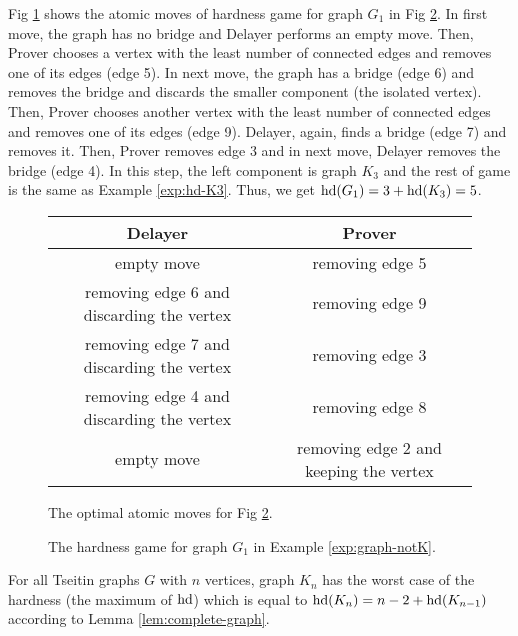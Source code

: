 \documentclass{report}
\begin{document}
\begin{examp}\label{exp:graph-notK}
Fig \ref{fig:game4} shows the atomic moves of hardness game for graph $G_1$ in Fig \ref{fig:hd4}. In first move, the graph has no bridge and Delayer performs an empty move. Then, Prover chooses a vertex with the least number of connected edges and removes one of its edges (edge 5). In next move, the graph has a bridge (edge 6) and removes the bridge and discards the smaller component (the isolated vertex). Then, Prover chooses another vertex with the least number of connected edges and removes one of its edges (edge 9). Delayer, again, finds a bridge (edge 7) and removes it. Then, Prover removes edge 3 and in next move, Delayer removes the bridge (edge 4). In this step, the left component is graph $K_3$ and the rest of game is the same as Example \ref{exp:hd-K3}. Thus, we get $\operatorname{hd}(G_1)=3+\operatorname{hd}(K_3)=5$.
  \begin{figure}[h]
  \centering
  \begin{tabular}{|c|c|} 
  \hline
                  Delayer & Prover \\ \hline
                  empty move & removing edge 5  \\ \hline
		  removing edge 6 and discarding the vertex & removing edge 9  \\ \hline
		  removing edge 7 and discarding the vertex & removing edge 3  \\ \hline
		  removing edge 4 and discarding the vertex & removing edge 8  \\ \hline
		  empty move & removing edge 2  and keeping the vertex\\ \hline

   \end{tabular}
   \caption{The optimal atomic moves for Fig \ref{fig:hd4}.} \label{fig:game4}
   \end{figure}
   \begin{figure}
   \begin{center}
   \caption{The hardness game for graph $G_1$ in Example \ref{exp:graph-notK}.}  \label{fig:hd4}
   \end{center}
   \end{figure}
\end{examp}
  
\begin{conj}\label{con:hd_game2}
For all Tseitin graphs $G$ with $n$ vertices, graph $K_n$ has the worst case of the hardness (the maximum of $\operatorname{hd}$) which is equal to $\operatorname{hd}(K_n)= n-2+\operatorname{hd}(K_{n-1})$ according to Lemma \ref{lem:complete-graph}.
\end{conj}
\end{document}

